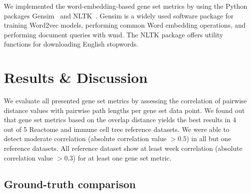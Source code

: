 \documentclass{thesisclass}
\begin{document}
We implemented the word-embedding-based gene set metrics by using the Python packages Gensim~\cite{rehurek_lrec} and NLTK~\cite{Loper:2002:NNL:1118108.1118117}. Gensim is a widely used software package for training Word2vec models, performing common Word embedding operations, and performing document queries with \acrshort{wmd}. The NLTK package offers utility functions for downloading English stopwords.


\chapter{Results \& Discussion}
\label{ch:results}

We evaluate all presented gene set metrics by assessing the correlation of pairwise distance values with pairwise path lengths per gene set data point. We found out that gene set metrics based on the overlap distance yields the best results in 4 out of 5 Reactome and immune cell tree reference datasets. We were able to detect moderate correlation (absolute correlation value $> 0.5$) in all but one reference datasets. All reference dataset show at least week correlation (absolute correlation value $> 0.3$) for at least one gene set metric.

\section{Ground-truth comparison}
\end{document}
